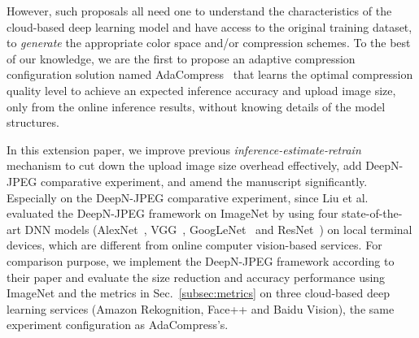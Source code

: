 However, such proposals all need one to understand the characteristics of the cloud-based deep learning model and have access to the original training dataset, to \emph{generate} the appropriate color space and/or compression schemes. To the best of our knowledge, we are the first to propose an adaptive compression configuration solution named AdaCompress~\cite{2019adacompress} that learns the optimal compression quality level to achieve an expected inference accuracy and upload image size, only from the online inference results, without knowing details of the model structures. 

In this extension paper, we improve previous \emph{inference-estimate-retrain} mechanism to cut down the upload image size overhead effectively, add DeepN-JPEG comparative experiment, and amend the manuscript significantly. Especially on the DeepN-JPEG comparative experiment, since Liu et al.~\cite{DeepN-JPEG} evaluated the DeepN-JPEG framework on ImageNet by using four state-of-the-art DNN models (AlexNet~\cite{AlexNet-krizhevsky2012imagenet}, VGG~\cite{VGG-simonyan2014very}, GoogLeNet~\cite{GoogleNet-szegedy2015going} and ResNet~\cite{ResNet-he2016deep}) on local terminal devices, which are different from online computer vision-based services. For comparison purpose, we implement the DeepN-JPEG framework according to their paper and evaluate the size reduction and accuracy performance using ImageNet and the metrics in Sec.~\ref{subsec:metrics} on three cloud-based deep learning services (Amazon Rekognition, Face++ and Baidu Vision), the same experiment configuration as AdaCompress's.

